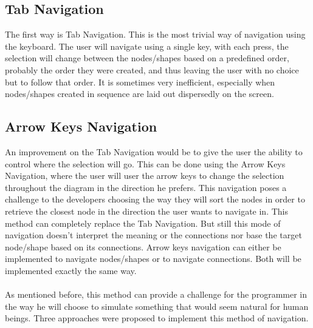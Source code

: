 \subsection{Tab Navigation}
The first way is Tab Navigation. This is the most trivial way of navigation using the keyboard. The user will navigate using a single key, with each press, the selection will change between the nodes/shapes based on a predefined order, probably the order they were created, and thus leaving the user with no choice but to follow that order. It is sometimes very inefficient, especially when nodes/shapes created in sequence are laid out dispersedly on the screen.

\subsection{Arrow Keys Navigation}
An improvement on the Tab Navigation would be to give the user the ability to control where the selection will go. This can be done using the Arrow Keys Navigation, where the user will user the arrow keys to change the selection throughout the diagram in the direction he prefers. This navigation poses a challenge to the developers choosing the way they will sort the nodes in order to retrieve the closest node in the direction the user wants to navigate in. This method can completely replace the Tab Navigation. But still this mode of navigation doesn't interpret the meaning or the connections nor base the target node/shape based on its connections.
Arrow keys navigation can either be implemented to navigate nodes/shapes or to navigate connections. Both will be implemented exactly the same way.

\paragraph{}
As mentioned before, this method can provide a challenge for the programmer in the way he will choose to simulate something that would seem natural for human beings. Three approaches were proposed to implement this method of navigation.

